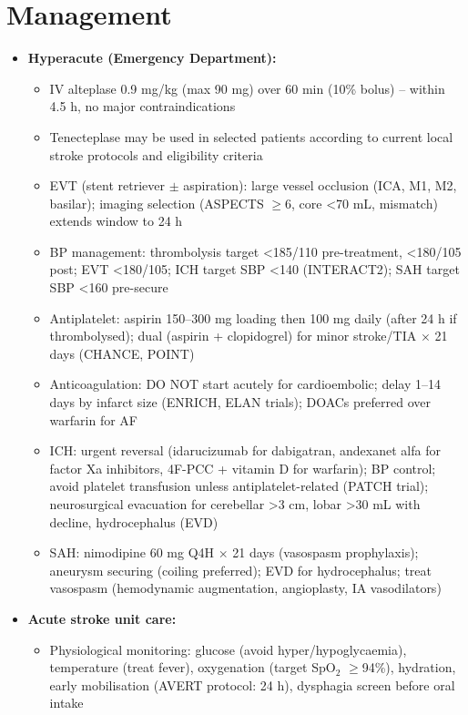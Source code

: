 \section*{Management}
\begin{itemize}
    \item \textbf{Hyperacute (Emergency Department):}
    \begin{itemize}
        \item IV alteplase 0.9 mg/kg (max 90 mg) over 60 min (10\% bolus) -- within 4.5 h, no major contraindications
        \item Tenecteplase may be used in selected patients according to current local stroke protocols and eligibility criteria
        \item EVT (stent retriever $\pm$ aspiration): large vessel occlusion (ICA, M1, M2, basilar); imaging selection (ASPECTS $\ge$6, core <70 mL, mismatch) extends window to 24 h
        \item BP management: thrombolysis target <185/110 pre-treatment, <180/105 post; EVT <180/105; ICH target SBP <140 (INTERACT2); SAH target SBP <160 pre-secure
        \item Antiplatelet: aspirin 150--300 mg loading then 100 mg daily (after 24 h if thrombolysed); dual (aspirin + clopidogrel) for minor stroke/TIA $\times$ 21 days (CHANCE, POINT)
        \item Anticoagulation: DO NOT start acutely for cardioembolic; delay 1--14 days by infarct size (ENRICH, ELAN trials); DOACs preferred over warfarin for AF
        \item ICH: urgent reversal (idarucizumab for dabigatran, andexanet alfa for factor Xa inhibitors, 4F-PCC + vitamin D for warfarin); BP control; avoid platelet transfusion unless antiplatelet-related (PATCH trial); neurosurgical evacuation for cerebellar >3 cm, lobar >30 mL with decline, hydrocephalus (EVD)
        \item SAH: nimodipine 60 mg Q4H $\times$ 21 days (vasospasm prophylaxis); aneurysm securing (coiling preferred); EVD for hydrocephalus; treat vasospasm (hemodynamic augmentation, angioplasty, IA vasodilators)
    \end{itemize}
    \item \textbf{Acute stroke unit care:}
    \begin{itemize}
        \item Physiological monitoring: glucose (avoid hyper/hypoglycaemia), temperature (treat fever), oxygenation (target SpO$_2$ $\ge$94\%), hydration, early mobilisation (AVERT protocol: 24 h), dysphagia screen before oral intake

\end{itemize}
\end{itemize}
